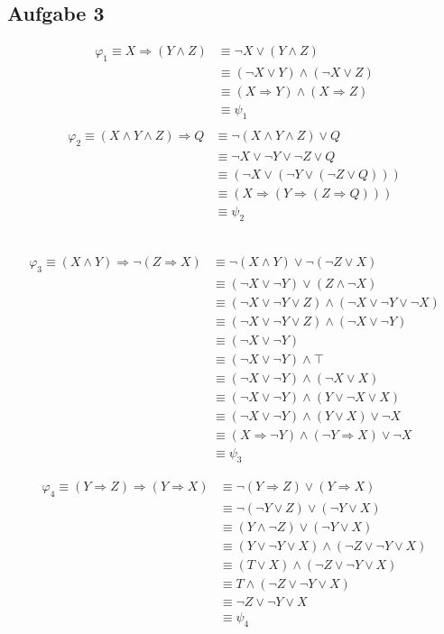 \documentclass[a4paper,10pt]{article}
\begin{document}
	\subsection*{Aufgabe 3}
	\begin{align*}
	\varphi_1 \equiv X \Rightarrow (Y \wedge Z) 
	&\equiv \neg X \vee (Y \wedge Z) \\
	&\equiv (\neg X \vee Y) \wedge (\neg X \vee Z) \\
	&\equiv (X \Rightarrow Y) \wedge (X \Rightarrow Z) \\
	&\equiv \psi_1 \\
	\end{align*}
	\begin{align*}
	\varphi_2 \equiv (X \wedge Y \wedge Z) \Rightarrow Q 
	&\equiv \neg (X \wedge Y \wedge Z) \vee Q \\
	&\equiv \neg X \vee \neg Y \vee \neg Z \vee Q \\
	&\equiv (\neg X \vee (\neg Y \vee (\neg Z \vee Q))) \\
	&\equiv (X \Rightarrow (Y \Rightarrow (Z \Rightarrow Q))) \\
	&\equiv \psi_2 
	\end{align*}	 \
	
	\begin{align*}
	\varphi_3 \equiv (X \wedge Y) \Rightarrow \neg (Z \Rightarrow X) 
	&\equiv \neg (X \wedge Y) \vee \neg (\neg Z \vee X)  \\
	&\equiv (\neg X \vee \neg Y) \vee (Z \wedge \neg X)  \\
	&\equiv (\neg X \vee \neg Y \vee Z) \wedge (\neg X \vee \neg Y \vee \neg X)  \\
	&\equiv (\neg X \vee \neg Y \vee Z) \wedge (\neg X \vee \neg Y)  \\
	&\equiv (\neg X \vee \neg Y) \\
	&\equiv (\neg X \vee \neg Y) \wedge \top \\
	&\equiv (\neg X \vee \neg Y) \wedge (\neg X \vee X) \\
	&\equiv (\neg X \vee \neg Y) \wedge (Y \vee \neg X \vee X) \\
	&\equiv (\neg X \vee \neg Y) \wedge (Y \vee X) \vee \neg X \\
	&\equiv (X \Rightarrow \neg Y) \wedge (\neg Y \Rightarrow X) \vee \neg X \\
	&\equiv \psi_3 
	\end{align*}
	
	\begin{align*}
	\varphi_4 \equiv (Y \Rightarrow Z) \Rightarrow (Y \Rightarrow X) 
	&\equiv \neg (Y \Rightarrow Z) \vee (Y \Rightarrow X) \\
	&\equiv \neg (\neg Y \vee Z) \vee (\neg Y \vee X) \\
	&\equiv (Y \wedge \neg Z) \vee (\neg Y \vee X) \\
	&\equiv (Y \vee \neg Y \vee X) \wedge (\neg Z \vee \neg Y \vee X)\\
	&\equiv (T \vee X) \wedge (\neg Z \vee \neg Y \vee X)\\
	&\equiv T \wedge (\neg Z \vee \neg Y \vee X)\\
	&\equiv \neg Z \vee \neg Y \vee X\\
	&\equiv \psi_4 
	\end{align*}
	
\end{document}
